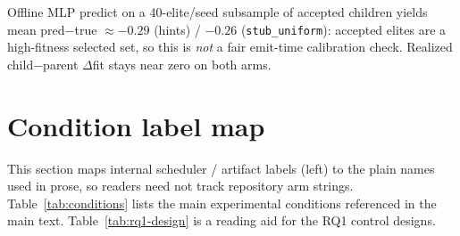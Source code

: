 \begin{table}[!htbp]
  \centering
  \caption{H1 LLM-candidate quality on accepted elites ($n{=}10$ seeds; mean$\pm$SD). Not confirmatory Holm. Rejected proposals unavailable per-seed.}
  \label{tab:h1-llm-quality}
  \small
\end{table}

\noindent Offline MLP predict on a 40-elite/seed subsample of accepted children yields mean pred$-$true ${\approx}{-}0.29$ (hints) / ${-}0.26$ (\texttt{stub\_uniform}): accepted elites are a high-fitness selected set, so this is \emph{not} a fair emit-time calibration check. Realized child$-$parent $\Delta$fit stays near zero on both arms.

\section{Condition label map}
\label{sec:arm-map}

This section maps internal scheduler / artifact labels (left) to the plain names used in prose, so readers need not track repository arm strings. Table~\ref{tab:conditions} lists the main experimental conditions referenced in the main text. Table~\ref{tab:rq1-design} is a reading aid for the RQ1 control designs.

